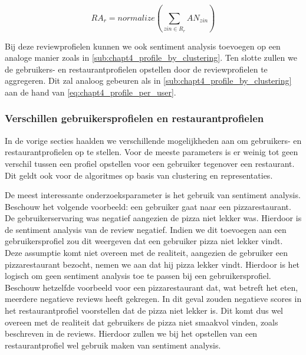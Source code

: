 \begin{equation}
\label{eq:chapt4_profile_per_review_approx}
    RA_{r} = normalize(\sum_{zin \in R_r}AN_{zin})
\end{equation}

Bij deze reviewprofielen kunnen we ook sentiment analysis toevoegen op een analoge manier zoals in \autoref{sub:chapt4_profile_by_clustering}. Ten slotte zullen we de gebruikers- en restaurantprofielen opstellen door de reviewprofielen te aggregeren. Dit zal analoog gebeuren als in \autoref{sub:chapt4_profile_by_clustering} aan de hand van \autoref{eq:chapt4_profile_per_user}.

\subsubsection{Verschillen gebruikersprofielen en restaurantprofielen}
\label{sub:chapt4_users_vs_restaurants}
In de vorige secties haalden we verschillende mogelijkheden aan om gebruikers- en restaurantprofielen op te stellen. Voor de meeste parameters is er weinig tot geen verschil tussen een profiel opstellen voor een gebruiker tegenover een restaurant. Dit geldt ook voor de algoritmes op basis van clustering en representaties.

De meest interessante onderzoeksparameter is het gebruik van sentiment analysis. Beschouw het volgende voorbeeld:\newline
een gebruiker gaat naar een pizzarestaurant. De gebruikerservaring was negatief aangezien de pizza niet lekker was. Hierdoor is de sentiment analysis van de review negatief. Indien we dit toevoegen aan een gebruikersprofiel zou dit weergeven dat een gebruiker pizza niet lekker vindt. Deze assumptie komt niet overeen met de realiteit, aangezien de gebruiker een pizzarestaurant bezocht, nemen we aan dat hij pizza lekker vindt. Hierdoor is het logisch om geen sentiment analysis toe te passen bij een gebruikersprofiel. \newline
Beschouw hetzelfde voorbeeld voor een pizzarestaurant dat, wat betreft het eten, meerdere negatieve reviews heeft gekregen. In dit geval zouden negatieve scores in het restaurantprofiel voorstellen dat de pizza niet lekker is. Dit komt dus wel overeen met de realiteit dat gebruikers de pizza niet smaakvol vinden, zoals beschreven in de reviews. Hierdoor zullen we bij het opstellen van een restaurantprofiel wel gebruik maken van sentiment analysis.

